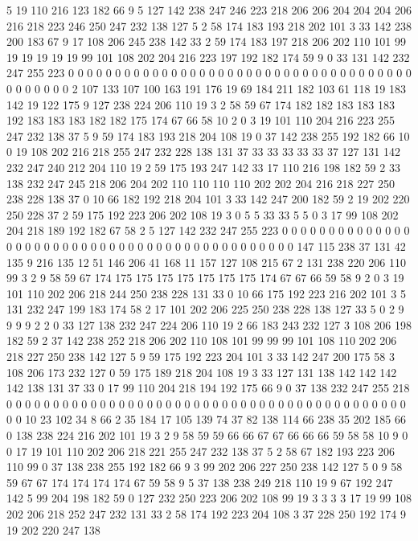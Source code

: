 5 19 110 216 123 182 66 9 5 127 142 238 247 246 223 218 206 206 204 204
204 206 216 218 223 246 250 247 232 138 127 5 2 58 174 183 193 218 202 101
3 33 142 238 200 183 67 9 17 108 206 245 238 142 33 2 59 174 183 197
218 206 202 110 101 99 19 19 19 19 19 99 101 108 202 204 216 223 197 192
182 174 59 9 0 33 131 142 232 247 255 223 0 0 0 0 0 0 0 0
0 0 0 0 0 0 0 0 0 0 0 0 0 0 0 0 0 0 0 0
0 0 0 0 0 0 0 0 0 0 0 0 0 0 0 0 2 107 133 107
100 163 191 176 19 69 184 211 182 103 61 118 19 183 142 19 122 175 9 127
238 224 206 110 19 3 2 58 59 67 174 182 182 183 183 183 192 183 183 183
182 182 175 174 67 66 58 10 2 0 3 19 101 110 204 216 223 255 247 232
138 37 5 9 59 174 183 193 218 204 108 19 0 37 142 238 255 192 182 66
10 0 19 108 202 216 218 255 247 232 228 138 131 37 33 33 33 33 33 37
127 131 142 232 247 240 212 204 110 19 2 59 175 193 247 142 33 17 110 216
198 182 59 2 33 138 232 247 245 218 206 204 202 110 110 110 110 202 202 204
216 218 227 250 238 228 138 37 0 10 66 182 192 218 204 101 3 33 142 247
200 182 59 2 19 202 220 250 228 37 2 59 175 192 223 206 202 108 19 3
0 5 5 33 33 5 5 0 3 17 99 108 202 204 218 189 192 182 67 58
2 5 127 142 232 247 255 223 0 0 0 0 0 0 0 0 0 0 0 0
0 0 0 0 0 0 0 0 0 0 0 0 0 0 0 0 0 0 0 0
0 0 0 0 0 0 0 0 0 0 0 0 0 147 115 238 37 131 42 135
9 216 135 12 51 146 206 41 168 11 157 127 108 215 67 2 131 238 220 206
110 99 3 2 9 58 59 67 174 175 175 175 175 175 175 175 174 67 67 66
59 58 9 2 0 3 19 101 110 202 206 218 244 250 238 228 131 33 0 10
66 175 192 223 216 202 101 3 5 131 232 247 199 183 174 58 2 17 101 202
206 225 250 238 228 138 127 33 5 0 2 9 9 9 9 2 2 0 33 127
138 232 247 224 206 110 19 2 66 183 243 232 127 3 108 206 198 182 59 2
37 142 238 252 218 206 202 110 108 101 99 99 99 101 108 110 202 206 218 227
250 238 142 127 5 9 59 175 192 223 204 101 3 33 142 247 200 175 58 3
108 206 173 232 127 0 59 175 189 218 204 108 19 3 33 127 131 138 142 142
142 142 138 131 37 33 0 17 99 110 204 218 194 192 175 66 9 0 37 138
232 247 255 218 0 0 0 0 0 0 0 0 0 0 0 0 0 0 0 0
0 0 0 0 0 0 0 0 0 0 0 0 0 0 0 0 0 0 0 0
0 0 0 0 0 0 0 0 0 10 23 102 34 8 66 2 35 184 17 105
139 74 37 82 138 114 66 238 35 202 185 66 0 138 238 224 216 202 101 19
3 2 9 58 59 59 66 66 67 67 66 66 66 59 58 58 10 9 0 0
17 19 101 110 202 206 218 221 255 247 232 138 37 5 2 58 67 182 193 223
206 110 99 0 37 138 238 255 192 182 66 9 3 99 202 206 227 250 238 142
127 5 0 9 58 59 67 67 174 174 174 174 67 59 58 9 5 37 138 238
249 218 110 19 9 67 192 247 142 5 99 204 198 182 59 0 127 232 250 223
206 202 108 99 19 3 3 3 3 17 19 99 108 202 206 218 252 247 232 131
33 2 58 174 192 223 204 108 3 37 228 250 192 174 9 19 202 220 247 138
